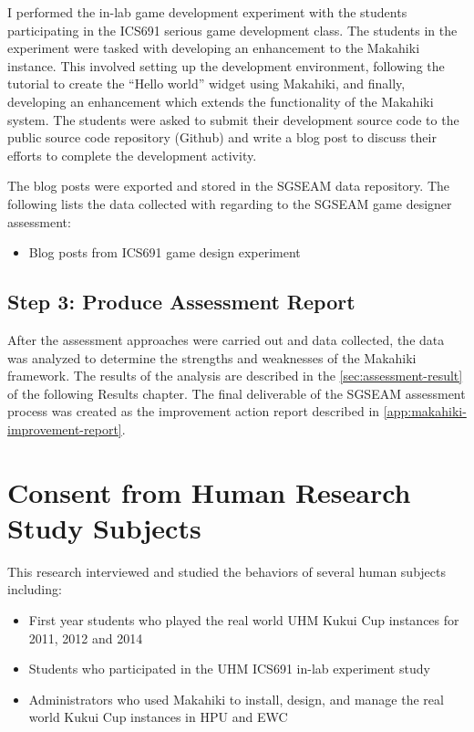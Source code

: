 I performed the in-lab game development experiment with the students participating in the ICS691 serious game development class. The students in the experiment were tasked with developing an enhancement to the Makahiki instance. This involved setting up the development environment, following the tutorial to create the ``Hello world'' widget using Makahiki, and finally, developing an enhancement which extends the functionality of the Makahiki system. 
The students were asked to submit their development source code to the public source code repository (Github) and write a blog post to discuss their efforts to complete the development activity.

The blog posts were exported and stored in the SGSEAM data repository. The following lists the data collected with regarding to the SGSEAM game designer assessment:

\begin{itemize}
\item Blog posts from ICS691 game design experiment
\end{itemize}

\subsection{Step 3: Produce Assessment Report}

After the assessment approaches were carried out and data collected, the data was analyzed to determine the strengths and weaknesses of the Makahiki framework. The results of the analysis are described in the \autoref{sec:assessment-result} of the following Results chapter. The final deliverable of the SGSEAM assessment process was created as the improvement action report described in \autoref{app:makahiki-improvement-report}.

\section{Consent from Human Research Study Subjects}
This research interviewed and studied the behaviors of several human subjects including:

\begin{itemize}
\item First year students who played the real world UHM Kukui Cup instances for 2011, 2012 and 2014
\item Students who participated in the UHM ICS691 in-lab experiment study
\item Administrators who used Makahiki to install, design, and manage the real world Kukui Cup instances in HPU and EWC
\end{itemize}

